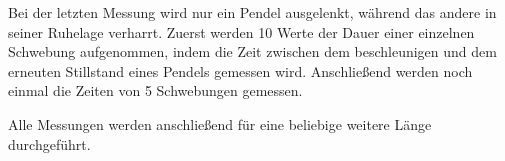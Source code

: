 Bei der letzten Messung wird nur ein Pendel ausgelenkt, während das andere in seiner Ruhelage
verharrt. Zuerst werden 10 Werte der Dauer einer einzelnen Schwebung aufgenommen, indem die
Zeit zwischen dem beschleunigen und dem erneuten Stillstand eines Pendels gemessen wird.
Anschließend werden noch einmal die Zeiten von 5 Schwebungen gemessen.

Alle Messungen werden anschließend für eine beliebige weitere Länge durchgeführt.








